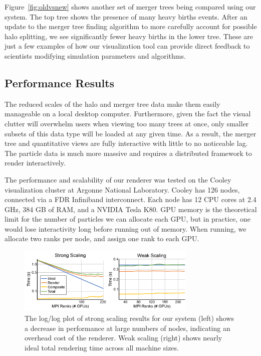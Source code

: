 Figure~\ref{fig:oldvsnew} shows another set of merger trees being compared using our system. The top tree shows the presence of many heavy births events. After an update to the merger tree finding algorithm to more carefully account for possible halo splitting, we see significantly fewer heavy births in the lower tree. These are just a few examples of how our visualization tool can provide direct feedback to scientists modifying simulation parameters and algorithms.

\subsection{Performance Results}
The reduced scales of the halo and merger tree data make them easily manageable on a local desktop computer. Furthermore, given the fact the visual clutter will overwhelm users when viewing too many trees at once, only smaller subsets of this data type will be loaded at any given time. As a result, the merger tree and quantitative views are fully interactive with little to no noticeable lag. The particle data is much more massive and requires a distributed framework to render interactively.

The performance and scalability of our renderer was tested on the Cooley visualization cluster at Argonne National Laboratory. Cooley has 126 nodes, connected via a FDR Infiniband interconnect. Each node has 12 CPU cores at 2.4 GHz, 384 GB of RAM, and a NVIDIA Tesla K80. GPU memory is the theoretical limit for the number of particles we can allocate each GPU, but in practice, one would lose interactivity long before running out of memory. When running, we allocate two ranks per node, and assign one rank to each GPU.

\begin{figure}[t]
	\includegraphics[width=8.5cm]{images/darkmatter/test_scaling2.png}
	\caption{The log/log plot of strong scaling results for our system (left) shows a decrease in performance at large numbers of nodes, indicating an overhead cost of the renderer. Weak scaling (right) shows nearly ideal total rendering time across all machine sizes.}
	\label{fig:scaling}
\end{figure}

